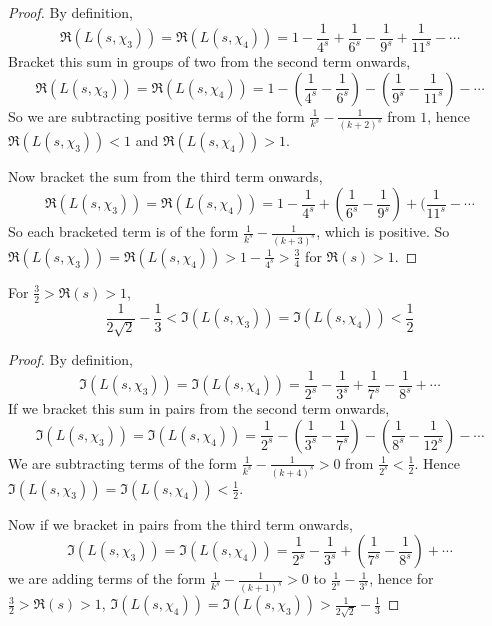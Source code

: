 \documentclass{unswmaths}
\begin{document}
    \begin{proof}
        By definition,
        \begin{equation*}
            \Re(L(s,\chi_3)) = \Re(L(s,\chi_4)) = 1-\frac{1}{4^s}+\frac{1}{6^s}-\frac{1}{9^s}+\frac{1}{11^s}-\cdots
        \end{equation*}
        Bracket this sum in groups of two from the second term onwards,
        \begin{equation*}
            \Re(L(s,\chi_3)) = \Re(L(s,\chi_4)) = 1-(\frac{1}{4^s}-\frac{1}{6^s})-(\frac{1}{9^s}-\frac{1}{11^s})-\cdots
        \end{equation*}
        So we are subtracting positive terms of the form $\frac{1}{k^s}-\frac{1}{(k+2)^s}$ from $1$, hence $\Re(L(s,\chi_3)) < 1$
        and $\Re(L(s,\chi_4)) > 1$.
        
        Now bracket the sum from the third term onwards, 
        \begin{equation*}
            \Re(L(s,\chi_3)) = \Re(L(s,\chi_4)) = 1-\frac{1}{4^s}+(\frac{1}{6^s}-\frac{1}{9^s})+(\frac{1}{11^s}-\cdots
        \end{equation*}
        So each bracketed term is of the form $\frac{1}{k^s}-\frac{1}{(k+3)^s}$, which is positive. So $\Re(L(s,\chi_3)) = \Re(L(s,\chi_4)) > 1-\frac{1}{4^s} > \frac{3}{4}$
        for $\Re(s) > 1$.
    \end{proof}
    \begin{lemma}
        For $\frac{3}{2} > \Re(s) > 1$, 
        \begin{equation*}
            \frac{1}{2\sqrt{2}}-\frac{1}{3} < \Im(L(s,\chi_3)) = \Im(L(s,\chi_4)) < \frac{1}{2}
        \end{equation*}
    \end{lemma}
    \begin{proof}
        By definition,
        \begin{equation*}
            \Im(L(s,\chi_3)) = \Im(L(s,\chi_4)) = \frac{1}{2^s}-\frac{1}{3^s}+\frac{1}{7^s}-\frac{1}{8^s}+\cdots
        \end{equation*}
        If we bracket this sum in pairs from the second term onwards,
        \begin{equation*}
            \Im(L(s,\chi_3)) = \Im(L(s,\chi_4)) = \frac{1}{2^s}-\left(\frac{1}{3^s}-\frac{1}{7^s}\right)-\left(\frac{1}{8^s}-\frac{1}{12^s}\right)-\cdots
        \end{equation*}
        We are subtracting terms of the form $\frac{1}{k^s}-\frac{1}{(k+4)^s} > 0$ from $\frac{1}{2^s} < \frac{1}{2}$. Hence $\Im(L(s,\chi_3)) = \Im(L(s,\chi_4)) < \frac{1}{2}$.
        
        Now if we bracket in pairs from the third term onwards,
        \begin{equation*}
            \Im(L(s,\chi_3)) = \Im(L(s,\chi_4)) = \frac{1}{2^s}-\frac{1}{3^s}+\left(\frac{1}{7^s}-\frac{1}{8^s}\right)+\cdots
        \end{equation*}
        we are adding terms of the form $\frac{1}{k^s}-\frac{1}{(k+1)^s} > 0$ to $\frac{1}{2^s}-\frac{1}{3^s}$, hence for $\frac{3}{2} > \Re(s) > 1$, $\Im(L(s,\chi_4)) = \Im(L(s,\chi_3)) > \frac{1}{2\sqrt{2}}-\frac{1}{3}$
    \end{proof} 
    
\end{document}
